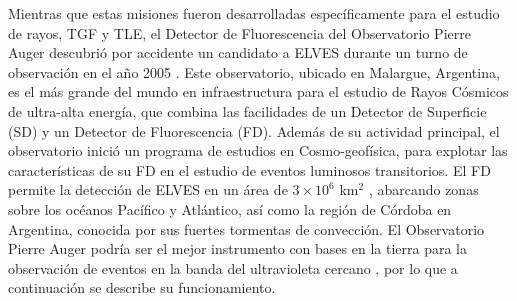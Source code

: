 \documentclass[11pt,oneside,openany,letter]{book}
\begin{document}
Mientras que estas misiones fueron desarrolladas específicamente para el estudio de rayos, TGF y TLE, el Detector de Fluorescencia del Observatorio Pierre Auger descubrió por accidente un candidato a ELVES durante un turno de observación en el año 2005 \cite{Mussa2019}. Este observatorio, ubicado en Malargue, Argentina, es el más grande del mundo en infraestructura para el estudio de Rayos Cósmicos de ultra-alta energía, que combina las facilidades de un Detector de Superficie (SD) y un Detector de Fluorescencia (FD). Además de su actividad principal, el observatorio inició un programa de estudios en Cosmo-geofísica, para explotar las características de su FD en el estudio de eventos luminosos transitorios. El FD permite la detecci\'on de ELVES en un \'area de $3 \times 10^{6}$ km$^2$ \cite{aab2020}, abarcando zonas sobre los océanos Pacífico y Atlántico, así como la región de Córdoba en Argentina, conocida por sus fuertes tormentas de convección. El Observatorio Pierre Auger podría ser el mejor instrumento con bases en la tierra para la observación de eventos en la banda del ultravioleta cercano \cite{MussaCiaccio2012}, por lo que a continuación se describe su funcionamiento.  

\end{document}
